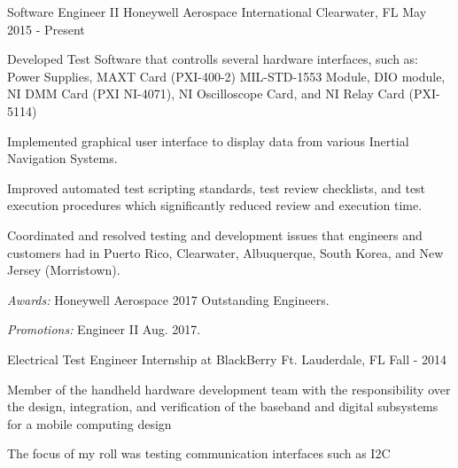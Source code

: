

\begin{cventries}

  \cventry
    {Software Engineer II} %
    {Honeywell Aerospace International} %
    {Clearwater, FL} %
    {May 2015 - Present} %
    {
      \begin{cvitems} %
				\item {Developed Test Software that controlls several hardware interfaces, such as: Power Supplies, MAXT Card (PXI-400-2) MIL-STD-1553 Module, DIO module, NI DMM Card (PXI NI-4071), NI Oscilloscope Card, and NI Relay Card (PXI-5114)} \item {Implemented graphical user interface to display data from various Inertial Navigation Systems.}
				\item {Improved automated test scripting standards, test review checklists, and test execution procedures which significantly reduced review and execution time.}
				\item {Coordinated and resolved testing and development issues that engineers and customers had in Puerto Rico, Clearwater, Albuquerque, South Korea, and New Jersey (Morristown).}
				\item {{\it Awards:} Honeywell Aerospace 2017 Outstanding Engineers.}
				\item {{\it Promotions:} Engineer II Aug. 2017.}
      \end{cvitems}
    }

	\cventry
		{Electrical Test Engineer} %
		{Internship at BlackBerry} %
		{Ft. Lauderdale, FL} %
		{Fall - 2014} %
		{
			\begin{cvitems} %
			\item {Member of the handheld hardware development team with the responsibility over the design, integration, and verification of the baseband and digital subsystems for a mobile computing design}
			\item {The focus of my roll was testing communication interfaces such as I2C}
			\end{cvitems}
		}
\end{cventries}
